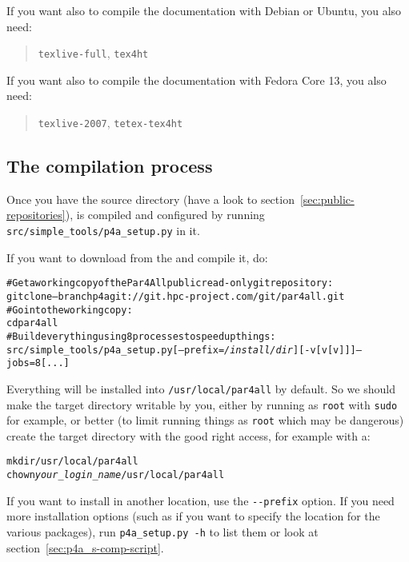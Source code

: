 \documentclass[a4paper]{article}
\begin{document}

If you want also to compile the documentation with Debian or Ubuntu, you 
also need:
\begin{quote}
  \texttt{texlive-full}, \texttt{tex4ht}
\end{quote}

If you want also to compile the documentation with Fedora Core 13, you 
also need:
\begin{quote}
  \texttt{texlive-2007}, \texttt{tetex-tex4ht}
\end{quote}

\subsection{The compilation process}
\label{sec:compilation-process}

Once you have the \Apfa source directory (have a look to
section~\ref{sec:public-repositories}), \Apfa is compiled and configured
by running \verb|src/simple_tools/p4a_setup.py| in it.

If you want to download \Apfa from the \Agit and compile it, do:
\begin{alltt}
# Get a working copy of the Par4All public read-only git repository:
git clone --branch p4a git://git.hpc-project.com/git/par4all.git
# Go into the working copy:
cd par4all
# Build everything using 8 processes to speed up things:
src/simple_tools/p4a_setup.py [--prefix=\emph{/install/dir}] [-v[v[v]]] --jobs=8 [...]
\end{alltt}%
Everything will be installed into \verb|/usr/local/par4all| by default.
So we should make the target directory writable by you, either by running
as \texttt{root} with \texttt{sudo} for example, or better (to limit
running things as \texttt{root} which may be dangerous) create the target
directory with the good right access, for example with a:
\begin{alltt}
mkdir /usr/local/par4all
chown \emph{your_login_name} /usr/local/par4all
\end{alltt}

If you want to install in another location, use the \verb|--prefix|
option.  If you need more installation options (such as if you want to
specify the location for the various packages), run \verb|p4a_setup.py -h| to
list them or look at section~\ref{sec:p4a_s-comp-script}.
\end{document}
